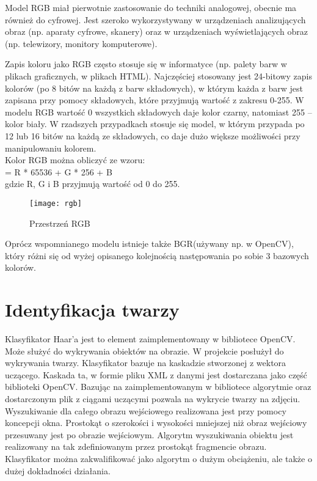 \documentclass[eng,printmode]{mgr}
\begin{document}
Model RGB miał pierwotnie zastosowanie do techniki analogowej, obecnie ma również do cyfrowej. Jest szeroko wykorzystywany w urządzeniach analizujących obraz (np. aparaty cyfrowe, skanery) oraz w urządzeniach wyświetlających obraz (np. telewizory, monitory komputerowe).

Zapis koloru jako RGB często stosuje się w informatyce (np. palety barw w plikach graficznych, w plikach HTML). Najczęściej stosowany jest 24-bitowy zapis kolorów (po 8 bitów na każdą z barw składowych), w którym każda z barw jest zapisana przy pomocy składowych, które przyjmują wartość z zakresu 0-255. W modelu RGB wartość 0 wszystkich składowych daje kolor czarny, natomiast 255 – kolor biały. W rzadszych przypadkach stosuje się model, w którym przypada po 12 lub 16 bitów na każdą ze składowych, co daje dużo większe możliwości przy manipulowaniu kolorem.\cite{wikirgb} \\
Kolor RGB można obliczyć ze wzoru:
\\
 = R * 65536 + G * 256 + B\\
gdzie R, G i B przyjmują wartość od 0 do 255.\\

\begin{figure}[placement h]
\texttt{[image: rgb]}
\caption{Przestrzeń RGB}
\end{figure}

Oprócz wspomnianego modelu istnieje także BGR(używany np. w OpenCV), który różni się od wyżej opisanego kolejnością następowania po sobie 3 bazowych kolorów.
\section{Identyfikacja twarzy}

Klasyfikator Haar'a jest to element zaimplementowany w bibliotece OpenCV. Może służyć do wykrywania obiektów na obrazie. W projekcie posłużył do wykrywania twarzy. Klasyfikator bazuje na kaskadzie stworzonej z wektora uczącego. Kaskada ta, w formie pliku XML z danymi jest dostarczana jako część biblioteki OpenCV. Bazując na zaimplementowanym w bibliotece algorytmie oraz dostarczonym plik z ciągami uczącymi pozwala na wykrycie twarzy na zdjęciu. Wyszukiwanie dla całego obrazu wejściowego realizowana jest przy pomocy koncepcji okna. Prostokąt o szerokości i wysokości mniejszej niż obraz wejściowy przesuwany jest po obrazie wejściowym. Algorytm wyszukiwania obiektu jest realizowany na tak zdefiniowanym przez prostokąt fragmencie obrazu. Klasyfikator można zakwalifikować jako algorytm o dużym obciążeniu, ale także o dużej dokładności działania.
\end{document}
